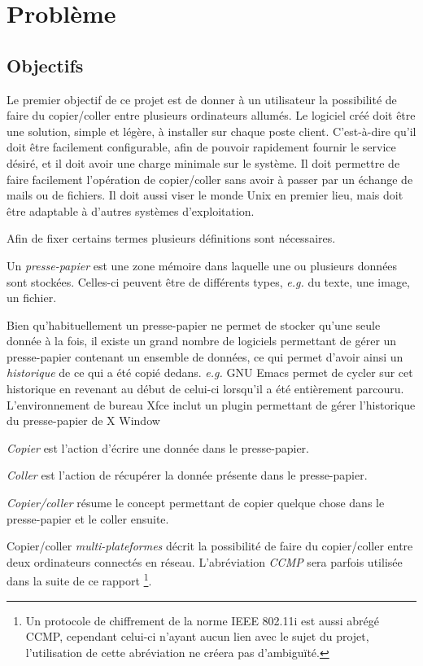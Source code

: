 \chapter{Problème}\label{ch:1}
\renewcommand{\leftmark}{\thechapter.~~Problème}
\section{Objectifs}
Le premier objectif de ce projet est de donner à un utilisateur la possibilité
de faire du copier/coller entre plusieurs ordinateurs allumés. Le logiciel
créé doit être une solution, simple et légère, à installer sur chaque
poste client. C'est-à-dire qu'il doit être facilement configurable, afin
de pouvoir rapidement fournir le service désiré, et il doit avoir
une charge minimale sur le système.
Il doit permettre de faire facilement l'opération de copier/coller
sans avoir à passer par un échange de mails ou de fichiers.
Il doit aussi viser le monde Unix en premier lieu, mais doit être adaptable
à d'autres systèmes d'exploitation.

Afin de fixer certains termes plusieurs définitions sont nécessaires.
\begin{defi}
  Un \emph{presse-papier} est une zone mémoire dans laquelle une ou
  plusieurs données sont stockées. Celles-ci peuvent être de différents types,
  \emph{e.g.} du texte, une image, un fichier.
\end{defi}
\begin{rem}
  Bien qu'habituellement un presse-papier ne permet de stocker qu'une seule
  donnée à la fois, il existe un grand nombre de logiciels permettant
  de gérer un presse-papier contenant un ensemble de données, ce qui permet
  d'avoir ainsi un \emph{historique} de ce qui a été copié dedans.
  \emph{e.g.} GNU Emacs \cite{emacs}
  permet de cycler sur cet historique en revenant au début de celui-ci
  lorsqu'il a été entièrement parcouru. L'environnement de bureau Xfce inclut
  un plugin permettant de gérer l'historique du presse-papier de X Window
  \cite{xfce-clipman}
\end{rem}
\begin{defi}
  \emph{Copier} est l'action d'écrire une donnée dans le presse-papier.
\end{defi}
\begin{defi}
  \emph{Coller} est l'action de récupérer la donnée présente dans le
  presse-papier.
\end{defi}
\begin{defi}
  \emph{Copier/coller} résume le concept permettant de copier
  quelque chose dans le presse-papier et le coller ensuite.
\end{defi}
\begin{defi}
  Copier/coller \emph{multi-plateformes} décrit la possibilité de faire
  du copier/coller entre deux ordinateurs connectés en réseau. L'abréviation
  \emph{CCMP} sera parfois utilisée dans la suite de ce rapport
  \footnote{Un protocole de chiffrement de la norme IEEE 802.11i est
  aussi abrégé CCMP, cependant celui-ci n'ayant aucun lien avec le sujet
  du projet, l'utilisation de cette abréviation ne créera pas d'ambiguïté.}.
\end{defi}


